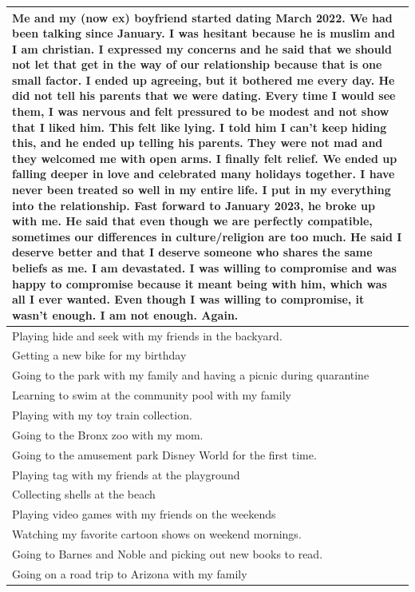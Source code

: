 \documentclass[
  .7em,
  letterpaper,
  DIV=11,
  numbers=noendperiod]{scrartcl}
\begin{document}
\begin{table}
\begin{tabular}{l}
\hline
Me and my (now ex) boyfriend started dating March 2022. We had been talking since January. I was hesitant because he is muslim and I am christian. I expressed my concerns and he said that we should not let that get in the way of our relationship because that is one small factor. I ended up agreeing, but it bothered me every day. He did not tell his parents that we were dating. Every time I would see them, I was nervous and felt pressured to be modest and not show that I liked him. This felt like lying. I told him I can't keep hiding this, and he ended up telling his parents. They were not mad and they welcomed me with open arms. I finally felt relief. We ended up falling deeper in love and celebrated many holidays together. I have never been treated so well in my entire life. I put in my everything into the relationship. Fast forward to January 2023, he broke up with me. He said that even though we are perfectly compatible, sometimes our differences in culture/religion are too much. He said I deserve better and that I deserve someone who shares the same beliefs as me. I am devastated. I was willing to compromise and was happy to compromise because it meant being with him, which was all I ever wanted. Even though I was willing to compromise, it wasn't enough. I am not enough. Again.\\
\hline
Playing hide and seek with my friends in the backyard.\\
\hline
Getting a new bike for my birthday\\
\hline
Going to the park with my family and having a picnic during quarantine\\
\hline
Learning to swim at the community pool with my family\\
\hline
Playing with my toy train collection.\\
\hline
Going to the Bronx zoo with my mom.\\
\hline
Going to the amusement park Disney World for the first time.\\
\hline
Playing tag with my friends at the playground\\
\hline
Collecting shells at the beach\\
\hline
Playing video games with my friends on the weekends\\
\hline
Watching my favorite cartoon shows on weekend mornings.\\
\hline
Going to Barnes and Noble and picking out new books to read.\\
\hline
Going on a road trip to Arizona with my family\\

\end{tabular}
\end{table}
\end{document}
